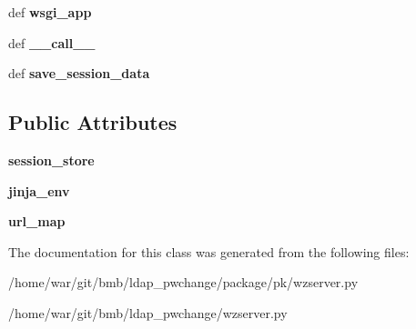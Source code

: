 \begin{DoxyCompactItemize}
\item 
\hypertarget{classwzserver_1_1WzServer_ad9ace307e3936d8ae3d2b42c23208e8b}{def {\bfseries wsgi\-\_\-app}}\label{classwzserver_1_1WzServer_ad9ace307e3936d8ae3d2b42c23208e8b}

\item 
\hypertarget{classwzserver_1_1WzServer_a7becba76cff1dd16f084d613c9ce2238}{def {\bfseries \-\_\-\-\_\-call\-\_\-\-\_\-}}\label{classwzserver_1_1WzServer_a7becba76cff1dd16f084d613c9ce2238}

\item 
\hypertarget{classwzserver_1_1WzServer_adda0194ac2db4cae016add3d6bebf1be}{def {\bfseries save\-\_\-session\-\_\-data}}\label{classwzserver_1_1WzServer_adda0194ac2db4cae016add3d6bebf1be}

\end{DoxyCompactItemize}
\subsection*{Public Attributes}
\begin{DoxyCompactItemize}
\item 
\hypertarget{classwzserver_1_1WzServer_a7272469b9646f4e9e36848bd985864a9}{{\bfseries session\-\_\-store}}\label{classwzserver_1_1WzServer_a7272469b9646f4e9e36848bd985864a9}

\item 
\hypertarget{classwzserver_1_1WzServer_a09ef23bbd3f0c78456302e61fc0a3d48}{{\bfseries jinja\-\_\-env}}\label{classwzserver_1_1WzServer_a09ef23bbd3f0c78456302e61fc0a3d48}

\item 
\hypertarget{classwzserver_1_1WzServer_ae2c3b8ed8efdae92a62fd755a48df995}{{\bfseries url\-\_\-map}}\label{classwzserver_1_1WzServer_ae2c3b8ed8efdae92a62fd755a48df995}

\end{DoxyCompactItemize}


The documentation for this class was generated from the following files\-:\begin{DoxyCompactItemize}
\item 
/home/war/git/bmb/ldap\-\_\-pwchange/package/pk/wzserver.\-py\item 
/home/war/git/bmb/ldap\-\_\-pwchange/wzserver.\-py\end{DoxyCompactItemize}
